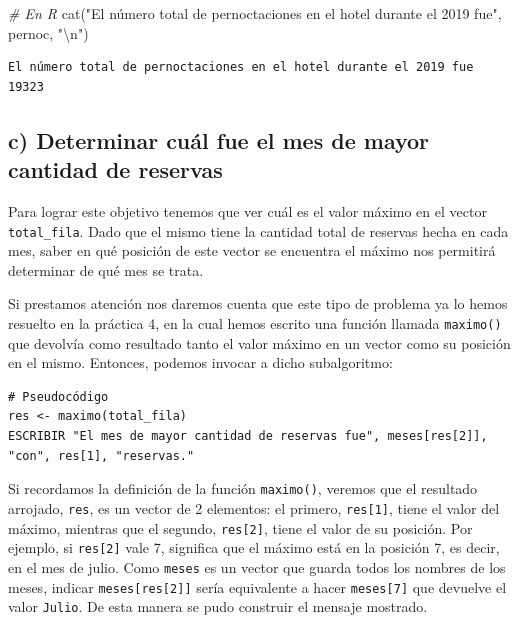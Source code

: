 \documentclass[
]{book}
\newenvironment{Shaded}{\begin{snugshade}}{\end{snugshade}}
\newcommand{\CommentTok}[1]{\textcolor[rgb]{0.56,0.35,0.01}{\textit{#1}}}
\newcommand{\FunctionTok}[1]{\textcolor[rgb]{0.00,0.00,0.00}{#1}}
\newcommand{\NormalTok}[1]{#1}
\newcommand{\SpecialCharTok}[1]{\textcolor[rgb]{0.00,0.00,0.00}{#1}}
\newcommand{\StringTok}[1]{\textcolor[rgb]{0.31,0.60,0.02}{#1}}
\begin{document}
\begin{Shaded}
\begin{Highlighting}[]
\CommentTok{\# En R}
\FunctionTok{cat}\NormalTok{(}\StringTok{"El número total de pernoctaciones en el hotel durante el 2019 fue"}\NormalTok{, pernoc, }\StringTok{"}\SpecialCharTok{\textbackslash{}n}\StringTok{"}\NormalTok{)}
\end{Highlighting}
\end{Shaded}

\begin{verbatim}
El número total de pernoctaciones en el hotel durante el 2019 fue 19323 
\end{verbatim}

\hypertarget{c-determinar-cuuxe1l-fue-el-mes-de-mayor-cantidad-de-reservas}{%
\subsection{c) Determinar cuál fue el mes de mayor cantidad de reservas}\label{c-determinar-cuuxe1l-fue-el-mes-de-mayor-cantidad-de-reservas}}

Para lograr este objetivo tenemos que ver cuál es el valor máximo en el vector \texttt{total\_fila}. Dado que el mismo tiene la cantidad total de reservas hecha en cada mes, saber en qué posición de este vector se encuentra el máximo nos permitirá determinar de qué mes se trata.

Si prestamos atención nos daremos cuenta que este tipo de problema ya lo hemos resuelto en la práctica 4, en la cual hemos escrito una función llamada \texttt{maximo()} que devolvía como resultado tanto el valor máximo en un vector como su posición en el mismo. Entonces, podemos invocar a dicho subalgoritmo:

\begin{verbatim}
# Pseudocódigo
res <- maximo(total_fila)
ESCRIBIR "El mes de mayor cantidad de reservas fue", meses[res[2]], "con", res[1], "reservas."
\end{verbatim}

Si recordamos la definición de la función \texttt{maximo()}, veremos que el resultado arrojado, \texttt{res}, es un vector de 2 elementos: el primero, \texttt{res{[}1{]}}, tiene el valor del máximo, mientras que el segundo, \texttt{res{[}2{]}}, tiene el valor de su posición. Por ejemplo, si \texttt{res{[}2{]}} vale 7, significa que el máximo está en la posición 7, es decir, en el mes de julio. Como \texttt{meses} es un vector que guarda todos los nombres de los meses, indicar \texttt{meses{[}res{[}2{]}{]}} sería equivalente a hacer \texttt{meses{[}7{]}} que devuelve el valor \texttt{Julio}. De esta manera se pudo construir el mensaje mostrado.
\end{document}
